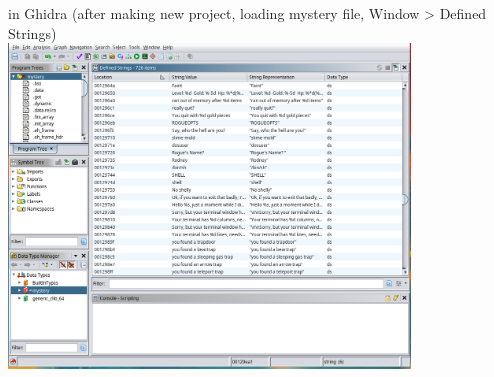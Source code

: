 

\begin{frame}{in Ghidra}
\small (after making new project, loading mystery file, Window > Defined Strings) \\
\includegraphics[width=0.8\textwidth]{../re-tools/ghidra-strings-mystery-ex}
\end{frame}

